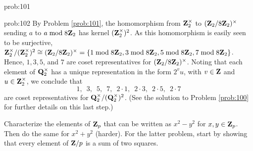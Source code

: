 \begin{sol}{prob:101}
\end{sol}


\begin{sol}{prob:102} By Problem \ref{prob:101}, the homomorphism from $\mathbf{Z}_2^{\times}$ to $(\mathbf{Z}_2/8\mathbf{Z}_2)^{\times}$ sending $a$ to $a\bmod{8\mathbf{Z}_2}$ has kernel $(\mathbf{Z}_2^{\times})^2$. As this homomorphism is easily seen to be surjective, $\mathbf{Z}_2^{\times}/(\mathbf{Z}_2^{\times})^2 \cong (\mathbf{Z}_2/8\mathbf{Z}_2)^{\times} = \{1\bmod{8\mathbf{Z}_2}, 3\bmod{8\mathbf{Z}_2}, 5\bmod{8\mathbf{Z}_2}, 7\bmod{8\mathbf{Z}_2}\}$. Hence, $1, 3, 5$, and $7$ are coset representatives for $(\mathbf{Z}_2/8\mathbf{Z}_2)^{\times}$. Noting that each element of $\mathbf{Q}_2^{\times}$ has a unique representation in the form $2^v u$, with $v \in \mathbf{Z}$ and $u \in \mathbf{Z}_2^{\times}$, we conclude that \[ 1,\enspace 3,\enspace 5,\enspace 7,\enspace 2\cdot 1,\enspace 2\cdot 3,\enspace 2\cdot 5,\enspace  2\cdot 7 \] are coset representatives for $\mathbf{Q}_2^{\times}/(\mathbf{Q}_2^{\times})^2$. (See the solution to Problem \ref{prob:100} for further details on this last step.)
\end{sol}

\begin{challenge} Characterize the elements of $\mathbf{Z}_p$ that can be written as $x^2-y^2$ for $x,y \in \mathbf{Z}_p$. Then do the same for $x^2+y^2$ (harder). For the latter problem, start by showing that every element of $\mathbf{Z}/p$ is a sum of two squares.
\end{challenge}


